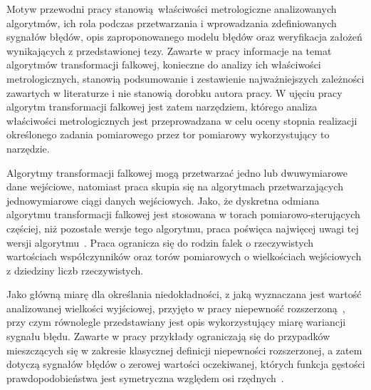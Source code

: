 Motyw przewodni pracy stanowią właściwości metrologiczne analizowanych algorytmów, ich rola podczas przetwarzania i wprowadzania zdefiniowanych sygnałów błędów, opis zaproponowanego modelu błędów oraz weryfikacja założeń wynikających z przedstawionej tezy. Zawarte w pracy informacje na temat algorytmów transformacji falkowej, konieczne do analizy ich właściwości metrologicznych, stanowią podsumowanie i zestawienie najważniejszych zależności zawartych w literaturze i nie stanowią dorobku autora pracy. W ujęciu pracy algorytm transformacji falkowej jest zatem narzędziem, którego analiza właściwości metrologicznych jest przeprowadzana w celu oceny stopnia realizacji określonego zadania pomiarowego przez tor pomiarowy wykorzystujący to narzędzie.

Algorytmy transformacji falkowej mogą przetwarzać jedno lub dwuwymiarowe dane wejściowe, natomiast praca skupia się na algorytmach przetwarzających jednowymiarowe ciągi danych wejściowych. Jako, że dyskretna odmiana algorytmu transformacji falkowej jest stosowana w torach pomiarowo-sterujących częściej, niż pozostałe wersje tego algorytmu, praca poświęca najwięcej uwagi tej wersji algorytmu~\cite{wallen_handbook, lord_guide, akujuobi_applications}. Praca ogranicza się do rodzin falek o rzeczywistych wartościach współczynników oraz torów pomiarowych o wielkościach wejściowych z dziedziny liczb rzeczywistych.

Jako główną miarę dla określania niedokładności, z jaką wyznaczana jest wartość analizowanej wielkości wyjściowej, przyjęto w pracy niepewność rozszerzoną~\cite{jcgm_guide}, przy czym równolegle przedstawiany jest opis wykorzystujący miarę wariancji sygnału błędu. Zawarte w pracy przykłady ograniczają się do przypadków mieszczących się w zakresie klasycznej definicji niepewności rozszerzonej, a zatem dotyczą sygnałów błędów o zerowej wartości oczekiwanej, których funkcja gęstości prawdopodobieństwa jest symetryczna względem osi rzędnych~\cite{jcgm_guide}.
